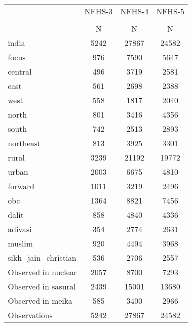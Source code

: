 {
\def\sym#1{\ifmmode^{#1}\else\(^{#1}\)\fi}
\begin{tabular}{l*{3}{c}}
\hline\hline
                    &      NFHS-3&      NFHS-4&      NFHS-5\\
                    &\multicolumn{1}{c}{}&\multicolumn{1}{c}{}&\multicolumn{1}{c}{}\\
                    &           N&           N&           N\\
\hline
india               &        5242&       27867&       24582\\
focus               &         976&        7590&        5647\\
central             &         496&        3719&        2581\\
east                &         561&        2698&        2388\\
west                &         558&        1817&        2040\\
north               &         801&        3416&        4356\\
south               &         742&        2513&        2893\\
northeast           &         813&        3925&        3301\\
rural               &        3239&       21192&       19772\\
urban               &        2003&        6675&        4810\\
forward             &        1011&        3219&        2496\\
obc                 &        1364&        8821&        7456\\
dalit               &         858&        4840&        4336\\
adivasi             &         354&        2774&        2631\\
muslim              &         920&        4494&        3968\\
sikh\_jain\_christian &         536&        2706&        2557\\
Observed in nuclear &        2057&        8700&        7293\\
Observed in sasural &        2439&       15001&       13680\\
Observed in meika   &         585&        3400&        2966\\
\hline
Observations        &        5242&       27867&       24582\\
\hline\hline
\end{tabular}
}
